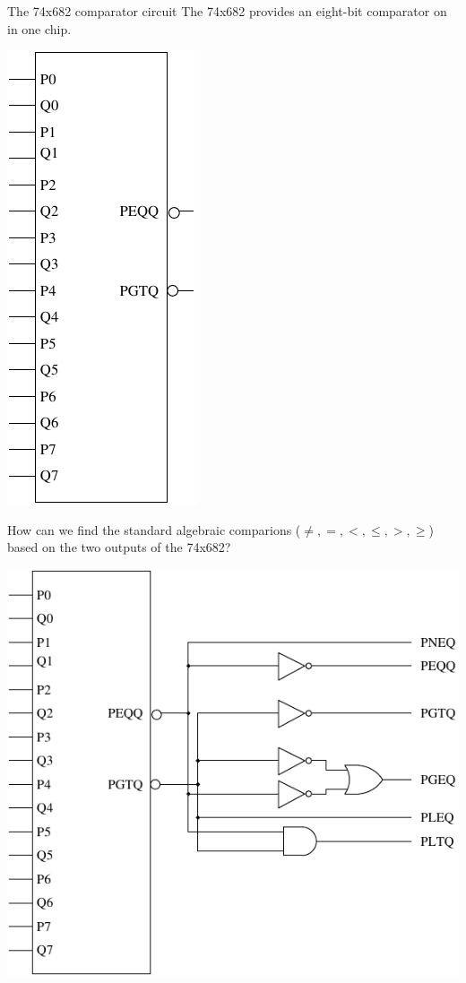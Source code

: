 \begin{frame}{The 74x682 comparator circuit}
  The 74x682 provides an eight-bit comparator on in one chip.\\
  \begin{center}
    \includegraphics[scale=0.5]{74x682Schematic}
  \end{center}
  How can we find the standard algebraic comparions ($\neq, =, <, \leq, >, \geq$) based on the two outputs of the 74x682?
\end{frame}

\includegraphics{74x682Extended}


